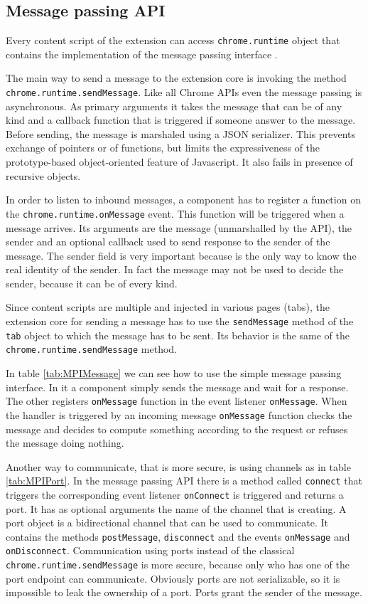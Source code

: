 \subsection{Message passing API}
\label{subs:MPI}
Every content script of the extension can access \texttt{chrome.runtime} object that contains the implementation of the message passing interface \cite{ChromeExtensionRuntime}. 

The main way to send a message to the extension core is invoking the method \texttt{chrome.runtime.sendMessage}. Like all Chrome APIs even the message passing is asynchronous. As primary arguments it takes the message that can be of any kind and a callback function that is triggered if someone answer to the message. Before sending, the message is marshaled using a JSON serializer. This prevents exchange of pointers or of functions, but limits the expressiveness of the prototype-based object-oriented feature of Javascript. It also fails in presence of recursive objects.

In order to listen to inbound messages, a component has to register a function on the \texttt{chrome.runtime.onMessage} event. This function will be triggered when a message arrives. Its arguments are the message (unmarshalled by the API), the sender and an optional callback used to send response to the sender of the message. The sender field is very important because is the only way to know the real identity of the sender. In fact the message may not be used to decide the sender, because it can be of every kind.

Since content scripts are multiple and injected in various pages (tabs), the extension core for sending a message has to use the \texttt{sendMessage} method of the \texttt{tab} object to which the message has to be sent. Its behavior is the same of the \texttt{chrome.runtime.sendMessage} method.

In table \ref{tab:MPIMessage} we can see how to use the simple message passing interface. In it a component simply sends the message and wait for a response. The other registers \texttt{onMessage} function in the event listener \texttt{onMessage}. When the handler is triggered by an incoming message \texttt{onMessage} function checks the message and decides to compute something according to the request or refuses the message doing nothing.

Another way to communicate, that is more secure, is using channels as in table \ref{tab:MPIPort}. In the message passing API there is a method called \texttt{connect} that triggers the corresponding event listener \texttt{onConnect} is triggered and returns a port. It has as optional arguments the name of the channel that is creating. A port object is a bidirectional channel that can be used to communicate. It contains the methods \texttt{postMessage}, \texttt{disconnect} and the events \texttt{onMessage} and \texttt{onDisconnect}. Communication using ports instead of the classical \texttt{chrome.runtime.sendMessage} is more secure, because only who has one of the port endpoint can communicate. Obviously ports are not serializable, so it is impossible to leak the ownership of a port. Ports grant the sender of the message.

